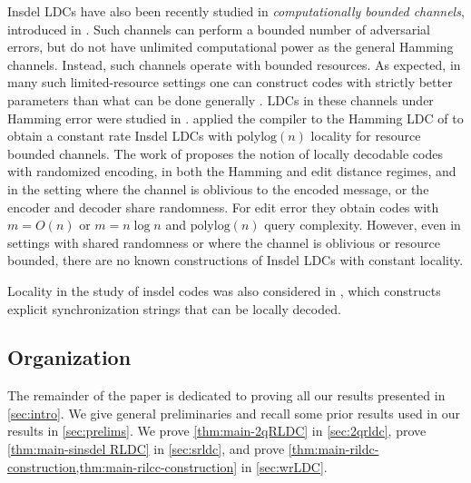 \documentclass[10pt,a4paper]{article}
\theoremstyle{remark}
\newcommand{\polylog}{\ensuremath{\mathrm{polylog}}\xspace}
\newcommand{\authnote}[3]{\textcolor{#2}{{\sf (#1's Note: {\sl{#3}})}}}
\newcommand{\xnote}{\authnote{Xin}{magenta}}
\newcommand{\enote}{\authnote{Elena}{green}}
\newcommand{\alex}[1]{\authnote{Alex}{orange}{#1}}
\newcommand{\authnote}{}
\newcommand{\xnote}[1]{}
\newcommand{\enote}[1]{}
\newcommand{\alex}[1]{}
\begin{document}
Insdel LDCs have also been recently studied in {\em computationally bounded channels}, introduced in \cite{Lipton94}. Such channels can perform a bounded number of adversarial errors, but do not have unlimited computational power as the general Hamming channels. Instead, such channels operate with bounded resources.
As expected, in many such  limited-resource settings one can construct codes with strictly better parameters than what can be done generally \cite{GopalanLD04,MicaliPSW05, Guruswami_Smith:2016, ShaltielS16}. LDCs in these channels under Hamming error were studied in \cite{OPS07, HemenwayO08, HemenwayOSW11, HemenwayOW15, BlockiGGZ19,BlockiKZ19}. \cite{block2021private} applied the \cite{BlockBGKZ20} compiler to the Hamming LDC of \cite{BlockiKZ19} to obtain a constant rate Insdel LDCs with $\polylog(n)$ locality for resource bounded channels.  The work of \cite{ChengLZ20}  proposes the notion of locally decodable codes with randomized encoding, in both the Hamming and edit distance regimes, and in the setting where the channel is oblivious to the encoded message, or the encoder and decoder share randomness. For edit error they obtain codes with $m=O(n)$ or $m= n \log n$ and $\polylog(n)$ query complexity. However, even in settings with shared randomness or where the channel is oblivious or resource bounded, there are no known constructions of Insdel LDCs with constant locality.
 
Locality in the study of insdel codes was also considered in   \cite{HaeuplerS18}, which constructs explicit synchronization strings that can be locally decoded.





\subsection{Organization}
The remainder of the paper is dedicated to proving all our results presented in \cref{sec:intro}. %
We give general preliminaries and recall some prior results used in our results in \cref{sec:prelims}.
We prove \cref{thm:main-2qRLDC} in \cref{sec:2qrldc}, prove \cref{thm:main-sinsdel RLDC} in \cref{sec:srldc}, and prove \cref{thm:main-rildc-construction,thm:main-rilcc-construction} in \cref{sec:wrLDC}.
\end{document}
